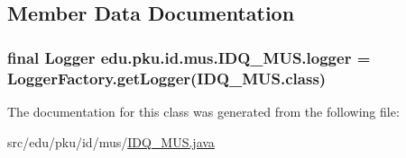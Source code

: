 \subsection{Member Data Documentation}
\hypertarget{classedu_1_1pku_1_1id_1_1mus_1_1_i_d_q___m_u_s_a6f22efdcc8448781e7f03a70b264db62}{
\subsubsection[{logger}]{\setlength{\rightskip}{0pt plus 5cm}final Logger {\bf edu.pku.id.mus.IDQ\_\-MUS.logger} = LoggerFactory.getLogger(IDQ\_\-MUS.class)}}
\label{classedu_1_1pku_1_1id_1_1mus_1_1_i_d_q___m_u_s_a6f22efdcc8448781e7f03a70b264db62}


The documentation for this class was generated from the following file:\begin{DoxyCompactItemize}
\item 
src/edu/pku/id/mus/\hyperlink{_i_d_q___m_u_s_8java}{IDQ\_\-MUS.java}\end{DoxyCompactItemize}
